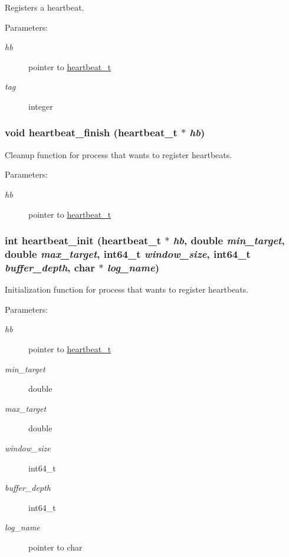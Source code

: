 Registers a heartbeat. 

\begin{Desc}
\item[Parameters:]
\begin{description}
\item[{\em hb}]pointer to \hyperlink{structheartbeat__t}{heartbeat\_\-t} \item[{\em tag}]integer \end{description}
\end{Desc}
\hypertarget{heartbeat-shared_8c_472683cf2037492695c74b37944efca9}{
\subsubsection[heartbeat\_\-finish]{\setlength{\rightskip}{0pt plus 5cm}void heartbeat\_\-finish ({\bf heartbeat\_\-t} $\ast$ {\em hb})}}
\label{heartbeat-shared_8c_472683cf2037492695c74b37944efca9}


Cleanup function for process that wants to register heartbeats. 

\begin{Desc}
\item[Parameters:]
\begin{description}
\item[{\em hb}]pointer to \hyperlink{structheartbeat__t}{heartbeat\_\-t} \end{description}
\end{Desc}
\hypertarget{heartbeat-shared_8c_b0215f451a25327778cf2469bbf17808}{
\subsubsection[heartbeat\_\-init]{\setlength{\rightskip}{0pt plus 5cm}int heartbeat\_\-init ({\bf heartbeat\_\-t} $\ast$ {\em hb}, \/  double {\em min\_\-target}, \/  double {\em max\_\-target}, \/  int64\_\-t {\em window\_\-size}, \/  int64\_\-t {\em buffer\_\-depth}, \/  char $\ast$ {\em log\_\-name})}}
\label{heartbeat-shared_8c_b0215f451a25327778cf2469bbf17808}


Initialization function for process that wants to register heartbeats. 

\begin{Desc}
\item[Parameters:]
\begin{description}
\item[{\em hb}]pointer to \hyperlink{structheartbeat__t}{heartbeat\_\-t} \item[{\em min\_\-target}]double \item[{\em max\_\-target}]double \item[{\em window\_\-size}]int64\_\-t \item[{\em buffer\_\-depth}]int64\_\-t \item[{\em log\_\-name}]pointer to char \end{description}
\end{Desc}
